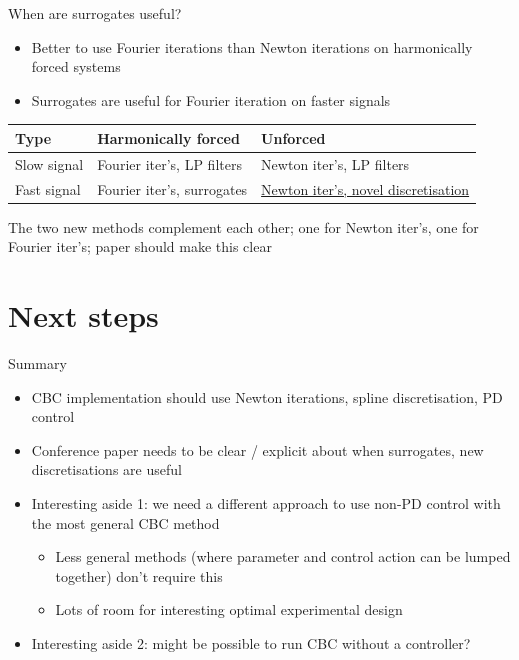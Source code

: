 \documentclass[presentation]{beamer}
\begin{document}
\begin{frame}[label={sec:org6d7aaaa}]{When are surrogates useful?}
\begin{itemize}
\item Better to use Fourier iterations than Newton iterations on harmonically forced systems
\item Surrogates are useful for Fourier iteration on faster signals
\end{itemize}

\vfill      

\begin{center}
\begin{tabular}{lll}
Type & Harmonically forced & Unforced\\
\hline
Slow signal & Fourier iter's, LP filters & Newton iter's, LP filters\\
Fast signal & \alert{Fourier iter's, surrogates} & \uline{Newton iter's, novel discretisation}\\
\end{tabular}
\end{center}

\vfill
The two new methods complement each other; one for Newton iter's, one for Fourier iter's; paper should make this clear
\end{frame}


\section{Next steps}
\label{sec:org1885959}
\begin{frame}[<+->][label={sec:org5614cad}]{Summary}
\begin{itemize}
\item CBC implementation should use Newton iterations, spline discretisation, PD control
\item Conference paper needs to be clear / explicit about when surrogates, new discretisations are useful
\item Interesting aside 1: we need a different approach to use non-PD control with the most general CBC method
\begin{itemize}
\item Less general methods (where parameter and control action can be lumped together) don't require this
\item Lots of room for interesting optimal experimental design
\end{itemize}
\item Interesting aside 2: might be possible to run CBC without a controller?
\end{itemize}
\end{frame}
\end{document}
